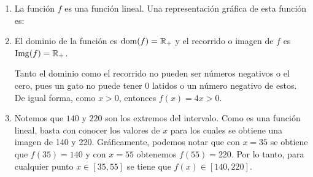 \documentclass[11pt,a4]{aleph-examen}
\begin{document}
\begin{preguntas}
\begin{respuesta}
\begin{enumerate}[label=\textit{\alph*)}]
    \item 
        La función $f$ es una función lineal. Una representación gráfica de esta función es:
        \begin{center}
        \end{center}
    
    \item 
        El dominio de la función es $\operatorname{dom}(f) = \mathbb{R}_+$ y el recorrido o imagen de $f$ es $\operatorname{Img}(f) = \mathbb{R}_+$.
    
        Tanto el dominio como el recorrido no pueden ser números negativos o el cero, pues un gato no puede tener $0$ latidos o un número negativo de estos. De igual forma, como $x > 0$, entonces $f(x) = 4x > 0$. 
    
    \item 
        Notemos que $140$ y $220$ son los extremos del intervalo. Como es una función lineal, basta con conocer los valores de $x$ para los cuales se obtiene una imagen de 140 y 220. Gráficamente, podemos notar que con $x = 35$ se obtiene que $f(35) = 140$ y con $x = 55$ obtenemos $f(55) = 220$. Por lo tanto, para cualquier punto $x \in [35,55]$ se tiene que $f(x) \in [140,220]$.\qedhere
\end{enumerate}
\end{respuesta}


\end{preguntas}
\end{document}
